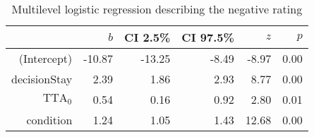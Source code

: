\begin{table}[h]
\centering
\caption{Multilevel logistic regression describing the negative rating}
\label{tab:rating}
\begin{tabular}{rrrrrr}
\toprule
 & $b$ & CI 2.5\% & CI 97.5\% & $z$ & $p$ \\
\midrule
(Intercept) & -10.87 & -13.25 & -8.49 & -8.97 & 0.00 \\
decisionStay & 2.39 & 1.86 & 2.93 & 8.77 & 0.00 \\
$\textrm{TTA}_0$ & 0.54 & 0.16 & 0.92 & 2.80 & 0.01 \\
condition & 1.24 & 1.05 & 1.43 & 12.68 & 0.00 \\
\bottomrule
\end{tabular}
\end{table}

